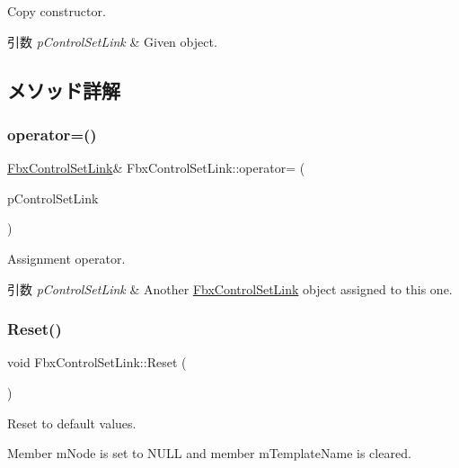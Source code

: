 Copy constructor. 
\begin{DoxyParams}{引数}
{\em p\+Control\+Set\+Link} & Given object. \\
\hline
\end{DoxyParams}


\subsection{メソッド詳解}
\mbox{\label{class_fbx_control_set_link_a32de9712bee72685b7447aa23b35bec7}} 
\subsubsection{\texorpdfstring{operator=()}{operator=()}}
{\footnotesize\ttfamily \hyperlink{class_fbx_control_set_link}{Fbx\+Control\+Set\+Link}\& Fbx\+Control\+Set\+Link\+::operator= (\begin{DoxyParamCaption}\item[{const \hyperlink{class_fbx_control_set_link}{Fbx\+Control\+Set\+Link} \&}]{p\+Control\+Set\+Link }\end{DoxyParamCaption})}

Assignment operator. 
\begin{DoxyParams}{引数}
{\em p\+Control\+Set\+Link} & Another \hyperlink{class_fbx_control_set_link}{Fbx\+Control\+Set\+Link} object assigned to this one. \\
\hline
\end{DoxyParams}
\mbox{\label{class_fbx_control_set_link_afedadf6bb18a836a2470636eda93ece9}} 
\subsubsection{\texorpdfstring{Reset()}{Reset()}}
{\footnotesize\ttfamily void Fbx\+Control\+Set\+Link\+::\+Reset (\begin{DoxyParamCaption}{ }\end{DoxyParamCaption})}

Reset to default values.

Member m\+Node is set to {\ttfamily N\+U\+LL} and member m\+Template\+Name is cleared. 


